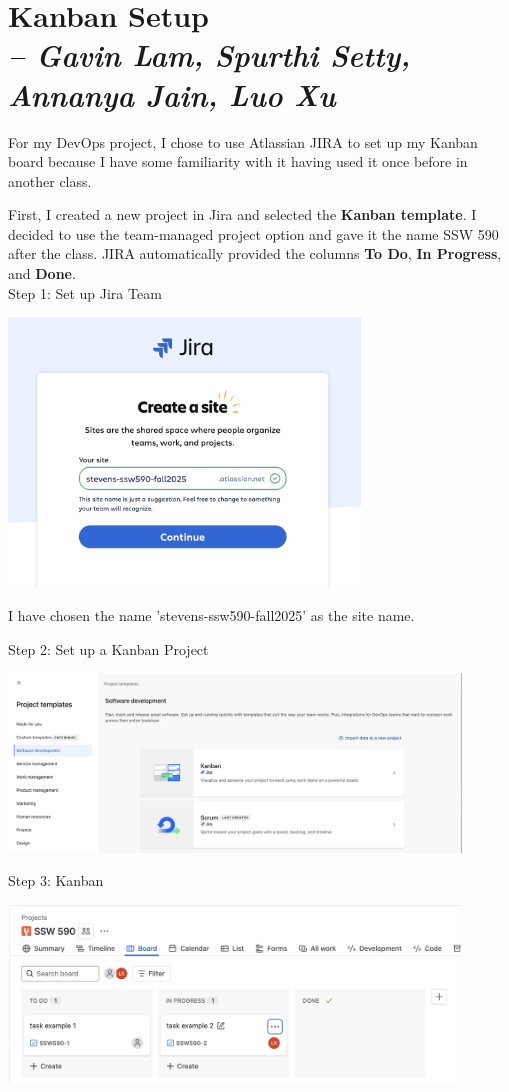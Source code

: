 \chapter{Kanban Setup \\
\small{\textit{-- Gavin Lam, Spurthi Setty, Annanya Jain, Luo Xu}}
\label{Chapter::Kanban Setup}}

For my DevOps project, I chose to use Atlassian JIRA to set up my Kanban board because I have some familiarity with it having used it once before in another class. \medskip

\noindent
First, I created a new project in Jira and selected the \textbf{Kanban template}. I decided to use the team-managed project option and gave it the name SSW 590 after the class. JIRA automatically provided the columns \textbf{To Do}, \textbf{In Progress}, and \textbf{Done}. \\


Step 1: Set up Jira Team 
\begin{center}
  \includegraphics[width=0.7\textwidth]{png/Jira_team_setup.png}
\end{center}
I have chosen the name 'stevens-ssw590-fall2025' as the site name. \newpage

Step 2: Set up a Kanban Project 
\begin{center}
  \includegraphics[width=0.9\textwidth]{png/creating_kanban_project2.png}
\end{center}

Step 3: Kanban
\begin{center}
  \includegraphics[width=0.9\textwidth]{png/kanban_example.png}
\end{center}
